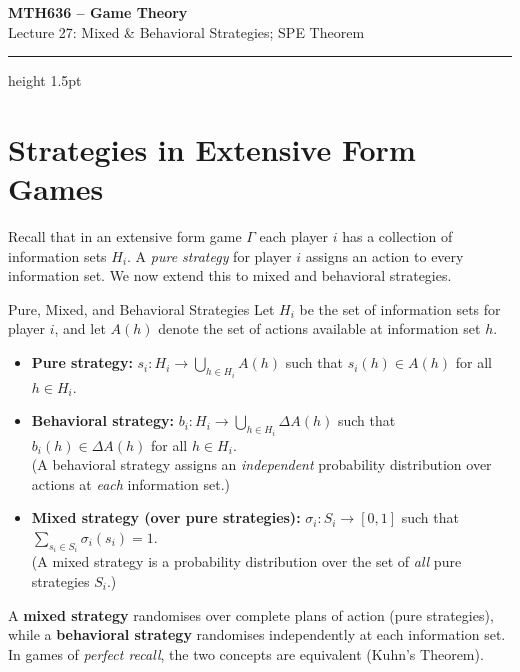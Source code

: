 \documentclass[12pt, a4paper]{article}
\begin{document}
\begin{center}
  {\LARGE\bfseries\sffamily\color{defblue} MTH636 -- Game Theory}\\[6pt]
  {\Large\sffamily Lecture 27: Mixed \& Behavioral Strategies; SPE Theorem}\\[4pt]
\end{center}
\vspace{0.5cm}
\hrule height 1.5pt
\vspace{0.3cm}

\section{Strategies in Extensive Form Games}

Recall that in an extensive form game $\Gamma$ each player $i$ has a
collection of information sets $H_i$. A \emph{pure strategy} for player $i$
assigns an action to every information set. We now extend this to mixed and
behavioral strategies.

\begin{defbox}{Pure, Mixed, and Behavioral Strategies}
  Let $H_i$ be the set of information sets for player $i$, and let $A(h)$
  denote the set of actions available at information set $h$.
  \begin{itemize}
    \item \textbf{Pure strategy:}
      $s_i : H_i \to \bigcup_{h \in H_i} A(h)$ \quad such that
      $s_i(h) \in A(h)$ for all $h \in H_i$.

    \item \textbf{Behavioral strategy:}
      $b_i : H_i \to \bigcup_{h \in H_i} \Delta A(h)$ \quad such that
      $b_i(h) \in \Delta A(h)$ for all $h \in H_i$. \\
      (A behavioral strategy assigns an \emph{independent} probability
      distribution over actions at \emph{each} information set.)

    \item \textbf{Mixed strategy (over pure strategies):}
      $\sigma_i : S_i \to [0,1]$ \quad such that
      $\sum_{s_i \in S_i} \sigma_i(s_i) = 1$.\\
      (A mixed strategy is a probability distribution over the set of
      \emph{all} pure strategies $S_i$.)
  \end{itemize}
\end{defbox}

\begin{notebox}
  A \textbf{mixed strategy} randomises over complete plans of action (pure
  strategies), while a \textbf{behavioral strategy} randomises independently
  at each information set. In games of \emph{perfect recall}, the two
  concepts are equivalent (Kuhn's Theorem).
\end{notebox}
\end{document}
